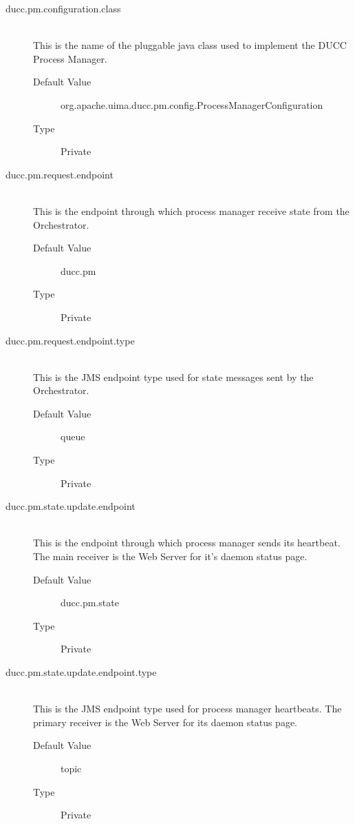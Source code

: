     \begin{description}

      \item[ducc.pm.configuration.class] \hfill \\
        This is the name of the pluggable java class used to implement the DUCC Process 
        Manager. 
        \begin{description}
          \item[Default Value] org.apache.uima.ducc.pm.config.ProcessManagerConfiguration 
          \item[Type] Private
        \end{description} 
        
      \item[ducc.pm.request.endpoint] \hfill \\
        This is the endpoint through which process manager receive state from the Orchestrator. 
        \begin{description}
          \item[Default Value] ducc.pm 
          \item[Type] Private 
        \end{description}
        
      \item[ducc.pm.request.endpoint.type] \hfill \\
        This is the JMS endpoint type used for state messages sent by the Orchestrator. 
        \begin{description}
          \item[Default Value] queue 
          \item[Type] Private 
        \end{description}
        
      \item[ducc.pm.state.update.endpoint] \hfill \\
        This is the endpoint through which process manager sends its heartbeat. The main receiver 
        is the Web Server for it's daemon status page. 
        \begin{description}
          \item[Default Value] ducc.pm.state 
          \item[Type] Private 
        \end{description}
        
      \item[ducc.pm.state.update.endpoint.type] \hfill \\
        This is the JMS endpoint type used for process manager heartbeats. The primary receiver 
        is the Web Server for its daemon status page. 
        \begin{description}
          \item[Default Value] topic 
          \item[Type] Private 
        \end{description}
        

\end{description}

